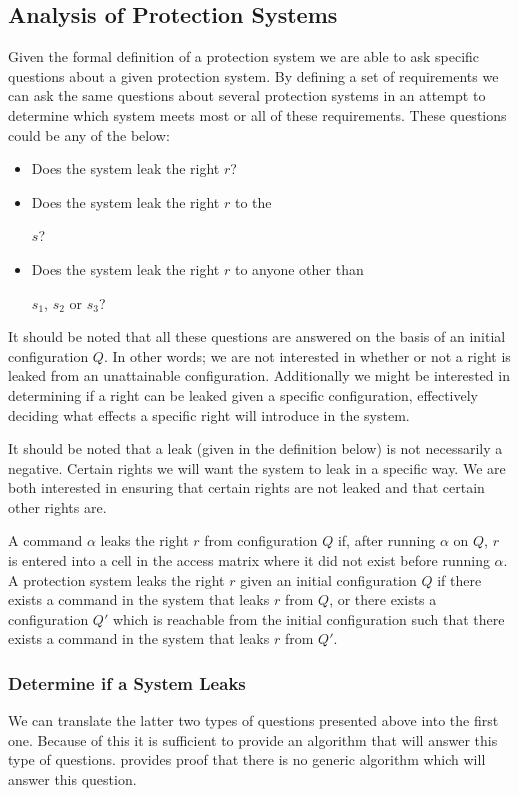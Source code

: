 \subsection{Analysis of Protection Systems}
Given the formal definition of a protection system we are able to ask specific questions about a given protection system.
By defining a set of requirements we can ask the same questions about several protection systems in an attempt to determine which system meets most or all of these requirements.
These questions could be any of the below:
\begin{itemize}
\item Does the system leak the right $r$?
\item Does the system leak the right $r$ to the \subject{} $s$?
\item Does the system leak the right $r$ to anyone other than \subject{} $s_1$, $s_2$ or $s_3$?
\end{itemize}
It should be noted that all these questions are answered on the basis of an initial configuration $Q$.
In other words; we are not interested in whether or not a right is leaked from an unattainable configuration.
Additionally we might be interested in determining if a right can be leaked given a specific configuration, effectively deciding what effects a specific right will introduce in the system.

It should be noted that a leak (given in the definition below) is not necessarily a negative.
Certain rights we will want the system to leak in a specific way.
We are both interested in ensuring that certain rights are not leaked and that certain other rights are.

\begin{definition}
A command $\alpha$ leaks the right $r$ from configuration $Q$ if, after running $\alpha$ on $Q$, $r$ is entered into a cell in the access matrix where it did not exist before running $\alpha$.
A protection system leaks the right $r$ given an initial configuration $Q$ if there exists a command in the system that leaks $r$ from $Q$, or there exists a configuration $Q'$ which is reachable from the initial configuration such that there exists a command in the system that leaks $r$ from $Q'$.
\end{definition}

\subsubsection{Determine if a System Leaks}
We can translate the latter two types of questions presented above into the first one.
Because of this it is sufficient to provide an algorithm that will answer this type of questions.
 provides proof that there is no generic algorithm which will answer this question.

